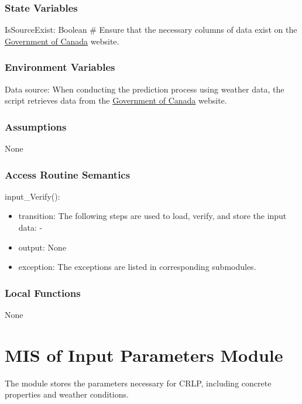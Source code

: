 \documentclass[12pt, titlepage]{article}
\begin{document}
\subsubsection{State Variables}

IsSourceExist: Boolean \# Ensure that the necessary columns of data exist on the \href{https://climate.weather.gc.ca/historical_data/search_historic_data_e.html} {Government of Canada} website.

\subsubsection{Environment Variables}

Data source: When conducting the prediction process using weather data, the script retrieves data from the \href{https://climate.weather.gc.ca/historical_data/search_historic_data_e.html} {Government of Canada} website.

\subsubsection{Assumptions}

None

\subsubsection{Access Routine Semantics}

input\_Verify():
\begin{itemize}
\item transition: The following steps are used to load, verify, and store the input data:
- 

\item output: None
\item exception: The exceptions are listed in corresponding submodules.

\end{itemize}
\subsubsection{Local Functions}
None
\newpage

\section{MIS of Input Parameters Module}
The module stores the parameters necessary for CRLP, including concrete properties and weather conditions.
\end{document}
